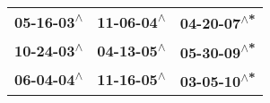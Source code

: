 \begin{supertabular}{lll}
 \textbf{05-16-03\textsuperscript{$\wedge$}} &  \textbf{11-06-04\textsuperscript{$\wedge$}} &  \textbf{04-20-07\textsuperscript{$\wedge$*}} \\
 \textbf{10-24-03\textsuperscript{$\wedge$}} &  \textbf{04-13-05\textsuperscript{$\wedge$}} &  \textbf{05-30-09\textsuperscript{$\wedge$*}} \\
 \textbf{06-04-04\textsuperscript{$\wedge$}} &  \textbf{11-16-05\textsuperscript{$\wedge$}} &  \textbf{03-05-10\textsuperscript{$\wedge$*}} \\
\end{supertabular}

